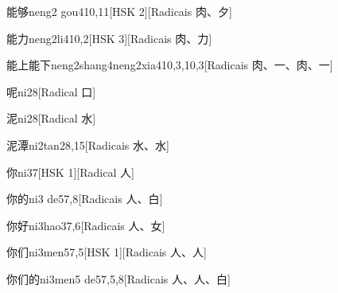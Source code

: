 \begin{entry}{能够}{neng2 gou4}{10,11}[HSK 2][Radicais ⾁、⼣]
\end{entry}

\begin{entry}{能力}{neng2li4}{10,2}[HSK 3][Radicais ⾁、⼒]
\end{entry}

\begin{entry}{能上能下}{neng2shang4neng2xia4}{10,3,10,3}[Radicais ⾁、⼀、⾁、⼀]
\end{entry}

\begin{entry}{呢}{ni2}{8}[Radical ⼝]
\end{entry}

\begin{entry}{泥}{ni2}{8}[Radical ⽔]
\end{entry}

\begin{entry}{泥潭}{ni2tan2}{8,15}[Radicais ⽔、⽔]
\end{entry}

\begin{entry}{你}{ni3}{7}[HSK 1][Radical ⼈]
\end{entry}

\begin{entry}{你的}{ni3 de5}{7,8}[Radicais ⼈、⽩]
\end{entry}

\begin{entry}{你好}{ni3hao3}{7,6}[Radicais ⼈、⼥]
\end{entry}

\begin{entry}{你们}{ni3men5}{7,5}[HSK 1][Radicais ⼈、⼈]
\end{entry}

\begin{entry}{你们的}{ni3men5 de5}{7,5,8}[Radicais ⼈、⼈、⽩]
\end{entry}


